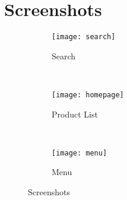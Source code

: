 \section{Screenshots}
\begin{figure}[!h]
    \centering
    \begin{subfigure}[b]{0.3\textwidth}
        \texttt{[image: search]}
        \caption{Search}
        \label{fig:search}
    \end{subfigure}
    ~
    \begin{subfigure}[b]{0.3\textwidth}
        \texttt{[image: homepage]}
        \caption{Product List}
        \label{fig:homepage}
    \end{subfigure}
    ~
    \begin{subfigure}[b]{0.3\textwidth}
        \texttt{[image: menu]}
        \caption{Menu}
        \label{fig:menu}
    \end{subfigure}
    \caption{Screenshots}\label{fig:scr3}
\end{figure}

